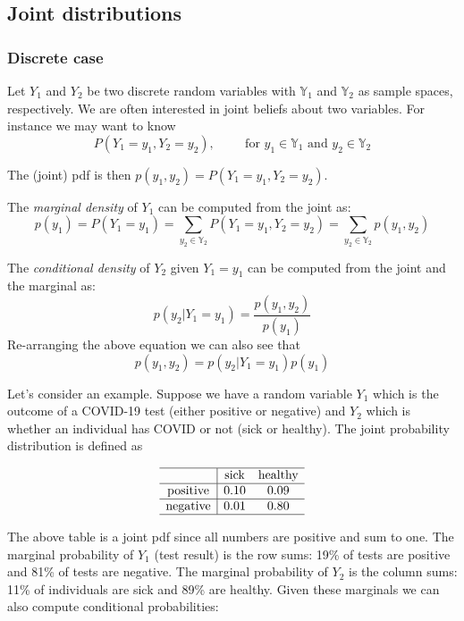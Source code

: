 \documentclass[
]{book}
\begin{document}
\hypertarget{joint-distributions}{%
\subsection{Joint distributions}\label{joint-distributions}}

\hypertarget{discrete-case}{%
\subsubsection{Discrete case}\label{discrete-case}}

Let \(Y_1\) and \(Y_2\) be two discrete random variables with \(\mathbb{Y}_1\) and \(\mathbb{Y}_2\) as sample spaces, respectively. We are often interested in joint beliefs about two variables. For instance we may want to know
\[
P(Y_1=y_1,Y_2=y_2), \hspace{1cm} \mbox{for } y_1\in\mathbb{Y}_1 \mbox{ and } y_2\in \mathbb{Y}_2
\]

The (joint) pdf is then \(p(y_1,y_2)=P(Y_1=y_1,Y_2=y_2)\).

The \emph{marginal density} of \(Y_1\) can be computed from the joint as:
\[
p(y_1)=P(Y_1=y_1)=\sum_{y_2\in\mathbb{Y}_2}P(Y_1=y_1,Y_2=y_2)=\sum_{y_2\in\mathbb{Y}_2}p(y_1,y_2)
\]

The \emph{conditional density} of \(Y_2\) given \(Y_1=y_1\) can be computed from the joint and the marginal as:
\[
p(y_2|Y_1=y_1)=\frac{p(y_1,y_2)}{p(y_1)}
\]
Re-arranging the above equation we can also see that
\[
p(y_1,y_2)= p(y_2|Y_1=y_1)p(y_1)
\]

Let's consider an example. Suppose we have a random variable \(Y_1\) which is the outcome of a COVID-19 test (either positive or negative) and \(Y_2\) which is whether an individual has COVID or not (sick or healthy). The joint probability distribution is defined as

\[
\begin{matrix}
    \begin{array}{c|cc} \hline
    &\text{sick} & \text{healthy} \\\hline
    \text{positive} & 0.10 & 0.09 \\\hline
    \text{negative} & 0.01 & 0.80 \\\hline
    \end{array}
\end{matrix}
\]

The above table is a joint pdf since all numbers are positive and sum to one. The marginal probability of \(Y_1\) (test result) is the row sums: 19\% of tests are positive and 81\% of tests are negative. The marginal probability of \(Y_2\) is the column sums: 11\% of individuals are sick and 89\% are healthy. Given these marginals we can also compute conditional probabilities:
\end{document}
